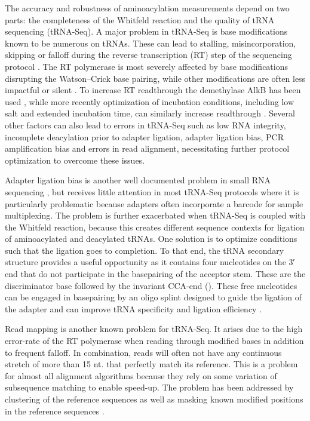 \documentclass[9pt,lineno]{elife}
\begin{document}
The accuracy and robustness of aminoacylation measurements depend on two parts: the completeness of the Whitfeld reaction and the quality of tRNA sequencing (tRNA-Seq).
A major problem in tRNA-Seq is base modifications known to be numerous on tRNAs.
These can lead to stalling, misincorporation, skipping or falloff during the reverse transcription (RT) step of the sequencing protocol \citep{Motorin2007-nb}.
The RT polymerase is most severely affected by base modifications disrupting the Watson–Crick base pairing, while other modifications are often less impactful or silent \citep{Wang2021-fc, Sas-Chen2019-um}.
To increase RT readthrough the demethylase AlkB has been used \citep{Zheng2015-kj, Cozen2015-cx}, while more recently optimization of incubation conditions, including low salt and extended incubation time, can similarly increase readthrough \citep{Behrens2021-gb}.
Several other factors can also lead to errors in tRNA-Seq such as low RNA integrity, incomplete deacylation prior to adapter ligation, adapter ligation bias, PCR amplification bias and errors in read alignment, necessitating further protocol optimization to overcome these issues. 

Adapter ligation bias is another well documented problem in small RNA sequencing \citep{Fuchs2015-nb, Zhuang2012-nu}, but receives little attention in most tRNA-Seq protocols where it is particularly problematic because adapters often incorporate a barcode for sample multiplexing.
The problem is further exacerbated when tRNA-Seq is coupled with the Whitfeld reaction, because this creates different sequence contexts for ligation of aminoacylated and deacylated tRNAs.
One solution is to optimize conditions such that the ligation goes to completion.
To that end, the tRNA secondary structure provides a useful opportunity as it contains four nucleotides on the 3′ end that do not participate in the basepairing of the acceptor stem.
These are the discriminator base followed by the invariant CCA-end ().
These free nucleotides can be engaged in basepairing by an oligo splint designed to guide the ligation of the adapter and can improve tRNA specificity and ligation efficiency \citep{Shigematsu2017-tv, Smith2015-ht}.

Read mapping is another known problem for tRNA-Seq.
It arises due to the high error-rate of the RT polymerase when reading through modified bases in addition to frequent falloff.
In combination, reads will often not have any continuous stretch of more than 15 nt. that perfectly match its reference.
This is a problem for almost all alignment algorithms because they rely on some variation of subsequence matching to enable speed-up.
The problem has been addressed by clustering of the reference sequences \citep{Hoffmann2018-uz} as well as masking known modified positions in the reference sequences \citep{Behrens2021-gb}.
\end{document}
